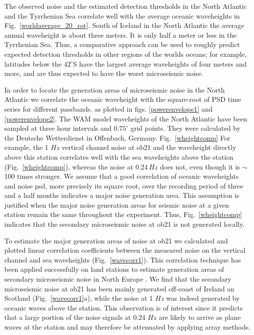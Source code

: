 \documentclass{article}
\begin{document}
{The observed noise and the estimated 
detection
thresholds 
in the North Atlantic and the Tyrrhenian Sea
correlate well with the average oceanic waveheights
in Fig.~\ref{worldaverage_20_rot}. 
South of Iceland in the North Atlantic the average annual waveheight 
is about three meters. It is only half a meter or less in the 
Tyrrhenian Sea.
Thus, a comparative approach can be used to 
roughly predict 
expected detection thresholds in other regions 
of the worlds oceans;
for example, latitudes below the $42^{\circ}$S have the largest
average waveheights of four  meters and more, and are thus expected
to have the worst microseismic noise.

In order to locate the generation areas of microseismic noise in the 
North Atlantic we correlate the oceanic waveheight 
with the square-root of
PSD time series for different passbands. 
as plotted in 
figs.  \ref{powerenvelope1} and \ref{powerenvelope2}.
The WAM model waveheights  of the North Atlantic have been 
sampled at three hour intervals and 
$0.75^{\circ}$ grid points. 
They were calculated by the Deutsche Wetterdienst in Offenbach, Germany.
Fig.~\ref{wheightcomp} 
For example, the 1 $Hz$ vertical channel 
noise at ob21 and the waveheight directly above this station 
correlates well with the sea waveheights above the station
(Fig.~\ref{wheightcomp}), 
whereas the noise at $0.24\, Hz$ does not, even though it is $\sim$100 times stronger.
We assume that a good correlation of oceanic waveheights and noise 
psd, more precisely its square root, 
over the recording period of three and a half months
indicates a major noise generation area.
This assumption is justified when the major noise generation areas for seismic noise at a given station remain the same throughout
the experiment.
Thus, 
Fig.~\ref{wheightcomp} indicates 
that the secondary microseismic noise at ob21 
is not generated locally.

To estimate the major generation areas of noise at ob21 we
calculated and plotted linear correlation coefficients between the 
measured noise on the vertical channel and 
sea waveheights (Fig.~\ref{wavecorr1}).
This correlation technique has been applied successfully 
on land stations 
to estimate generation areas of secondary microseismic noise
in North Europe
\cite[][]{essen:03}.
We find that the secondary microseismic noise at ob21 
has been mainly generated off-coast of Ireland an Scotland
(Fig.~\ref{wavecorr1}a), while the 
noise at 1 $Hz$ was indeed generated by oceanic waves above the station.
This observation is of interest since  it predicts that a large portion
of the noise signals at 0.24 $Hz$ are likely to 
arrive as plane waves at the station 
and may therefore be attenuated by applying array methods.

}
\end{document}
